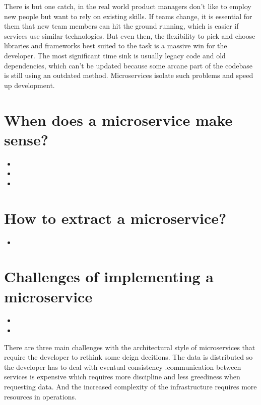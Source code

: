There is but one catch, in the real world product managers don't like to employ new people but want to rely on existing skills. If teams change, it is essential for them that new team members can hit the ground running, which is easier if services use similar technologies. But even then, the flexibility to pick and choose libraries and frameworks best suited to the task is a massive win for the developer. The most significant time sink is usually legacy code and old dependencies, which can't be updated because some arcane part of the codebase is still using an outdated method. Microservices isolate such problems and speed up development.


\section{When does a microservice make sense?}

\begin{itemize}
  \item {}
  \item {}
  \item {}
\end{itemize}


\section{How to extract a microservice?}

\begin{itemize}
  \item {}
\end{itemize}


\section{Challenges of implementing a microservice}

\begin{itemize}
  \item {}
  \item {}
\end{itemize}

There are three main challenges with the architectural style of microservices that require the developer to rethink some deign decitions. The data is distributed so the developer has to deal with eventual consistency .communication between services is expensive which requires more discipline and less greediness when requesting data. And the increased complexity of the infrastructure requires more resources in operations.


